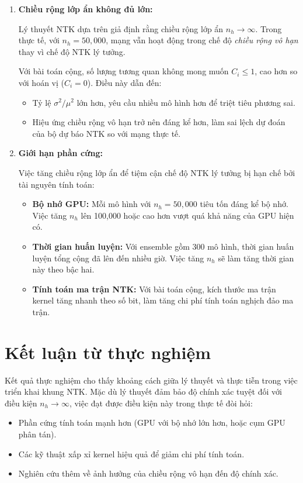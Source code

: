 \begin{enumerate}
    \item \textbf{Chiều rộng lớp ẩn không đủ lớn:}
    
    Lý thuyết NTK dựa trên giả định rằng chiều rộng lớp ẩn $n_h \rightarrow \infty$. Trong thực tế, với $n_h = 50,000$, mạng vẫn hoạt động trong chế độ \textit{chiều rộng vô hạn} thay vì chế độ NTK lý tưởng.
    
    Với bài toán cộng, số lượng tương quan không mong muốn $C_i \leq 1$, cao hơn so với hoán vị ($C_i = 0$). Điều này dẫn đến:
    \begin{itemize}
        \item Tỷ lệ $\sigma^2/\mu^2$ lớn hơn, yêu cầu nhiều mô hình hơn để triệt tiêu phương sai.
        \item Hiệu ứng chiều rộng vô hạn trở nên đáng kể hơn, làm sai lệch dự đoán của bộ dự báo NTK so với mạng thực tế.
    \end{itemize}
    
    \item \textbf{Giới hạn phần cứng:}
    
    Việc tăng chiều rộng lớp ẩn để tiệm cận chế độ NTK lý tưởng bị hạn chế bởi tài nguyên tính toán:
    \begin{itemize}
        \item \textbf{Bộ nhớ GPU:} Mỗi mô hình với $n_h = 50,000$ tiêu tốn đáng kể bộ nhớ. Việc tăng $n_h$ lên 100,000 hoặc cao hơn vượt quá khả năng của GPU hiện có.
        \item \textbf{Thời gian huấn luyện:} Với ensemble gồm 300 mô hình, thời gian huấn luyện tổng cộng đã lên đến nhiều giờ. Việc tăng $n_h$ sẽ làm tăng thời gian này theo bậc hai.
        \item \textbf{Tính toán ma trận NTK:} Với bài toán cộng, kích thước ma trận kernel tăng nhanh theo số bit, làm tăng chi phí tính toán nghịch đảo ma trận.
    \end{itemize}
\end{enumerate}

\section{Kết luận từ thực nghiệm}

Kết quả thực nghiệm cho thấy khoảng cách giữa lý thuyết và thực tiễn trong việc triển khai khung NTK. Mặc dù lý thuyết đảm bảo độ chính xác tuyệt đối với điều kiện $n_h \rightarrow \infty$, việc đạt được điều kiện này trong thực tế đòi hỏi:
\begin{itemize}
    \item Phần cứng tính toán mạnh hơn (GPU với bộ nhớ lớn hơn, hoặc cụm GPU phân tán).
    \item Các kỹ thuật xấp xỉ kernel hiệu quả để giảm chi phí tính toán.
    \item Nghiên cứu thêm về ảnh hưởng của chiều rộng vô hạn đến độ chính xác.
\end{itemize}


